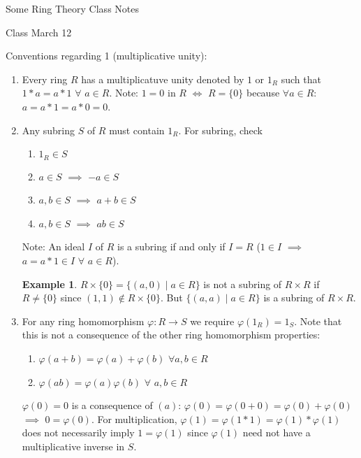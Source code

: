 \documentclass[11pt]{article}
\theoremstyle{definition}
\newtheorem{example}[thm]{Example}
\numberwithin{equation}{section}
\begin{document}
\begin{center}
{\sf\LARGE Some Ring Theory Class Notes}
\end{center}

\begin{center}
{\sf\LARGE Class March 12}
\end{center}

Conventions regarding 1 (multiplicative unity):
\begin{enumerate}
    \item Every ring $R$ has a multiplicatuve unity denoted by $1$ or $1_R$ such that $1*a = a*1$ $\forall$ $a \in R$. Note: $1 = 0$ in $R$ $\Leftrightarrow$ $R = \{0\}$ because $\forall a \in R$: $a = a * 1 = a * 0 = 0$.
    \item Any subring $S$ of $R$ must contain $1_R$. For subring, check
    \begin{enumerate}
        \item $1_{R} \in S$
        \item $a \in S$ $\implies$ $-a \in S$
        \item $a, b \in S$ $\implies$ $a + b \in S$
        \item $a, b \in S$ $\implies$ $ab \in S$
    \end{enumerate}
    Note: An ideal $I$ of $R$ is a subring if and only if $I = R$ ($1 \in I$ $\implies$ $a = a*1 \in I$ $\forall$ $a \in R$).\\
    \begin{example}
    $R \times \{0\} = \{(a, 0) \mid a \in R\}$ is not a subring of $R \times R$ if $R \neq \{0\}$ since $(1, 1) \notin R \times \{0\}$. But $\{(a, a) \mid a \in R\}$ is a subring of $R \times R$.
    \end{example}
    \item For any ring homomorphism $\varphi: R \rightarrow S$ we require $\varphi(1_R) = 1_S$. Note that this is not a consequence of the other ring homomorphism properties:
    \begin{enumerate}
        \item $\varphi(a + b) = \varphi(a) + \varphi(b)$ $\forall a, b \in R$
        \item $\varphi(ab) = \varphi(a)\varphi(b)$ $\forall$ $a, b \in R$
    \end{enumerate}
    $\varphi(0) = 0$ is a consequence of $(a)$: $\varphi(0) = \varphi(0 + 0) = \varphi(0) + \varphi(0)$ $\implies $ $0 = \varphi(0)$. For multiplication, $\varphi(1) = \varphi(1*1) = \varphi(1)*\varphi(1)$ does not necessarily imply $1 = \varphi(1)$ since $\varphi(1)$ need not have a multiplicative inverse in $S$.

\end{enumerate}
\end{document}
